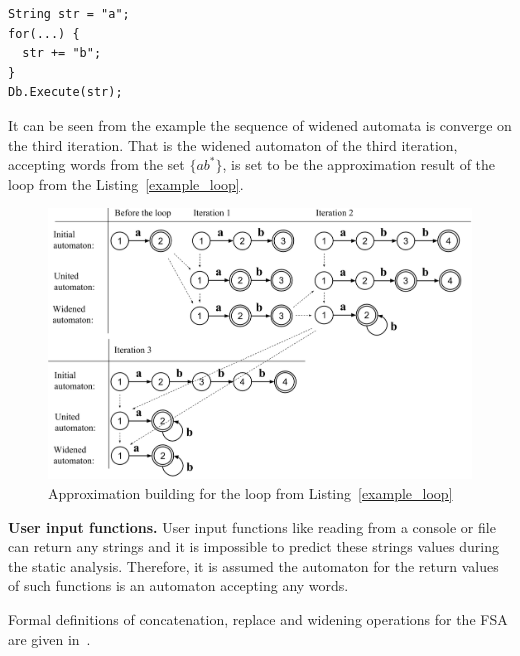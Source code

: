 \begin{lstlisting}[label=example_loop,caption=Loop with concatenation on C\#]
String str = "a";
for(...) {
  str += "b";
}     	
Db.Execute(str);
\end{lstlisting}

It can be seen from the example the sequence of widened automata is converge on the third iteration. That is the widened automaton of the third iteration, accepting words from the set $\{ ab^{*} \}$, is set to be the approximation result of the loop from the Listing~\ref{example_loop}.

\begin{figure}[h!]
    \begin{center}
        \includegraphics[scale=0.3]{Figures/automata_loop.png}
    \end{center}
    \caption{Approximation building for the loop from Listing~\ref{example_loop}}
    \label{automata_loop_pic}
\end{figure} 

\textbf{User input functions.} User input functions like reading from a console or file can return any strings and it is impossible to predict these strings values during the static analysis. Therefore, it is assumed the automaton for the return values of such functions is an automaton accepting any words.

Formal definitions of concatenation, replace and widening operations for the FSA are given in~\cite{Upper_Approximation:ref}.

